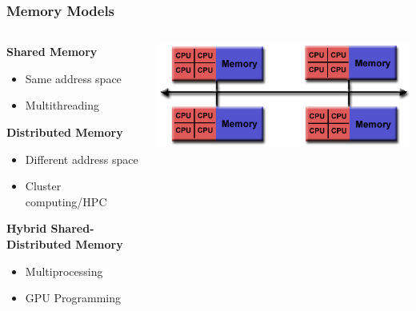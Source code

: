 \documentclass[t]{beamer}
\begin{document}
\begin{frame}
\frametitle{Memory Models}
\begin{columns}
\begin{column}{.4\textwidth}
\textbf{Shared Memory}
\begin{itemize}
  \item Same address space
  \item Multithreading
\end{itemize}

\textbf{Distributed Memory}
\begin{itemize}
  \item Different address space
  \item Cluster computing/HPC
\end{itemize}

\textbf{Hybrid Shared-Distributed Memory}
\begin{itemize}
  \item Multiprocessing
  \item GPU Programming
\end{itemize}
\end{column}

\begin{column}{.6\textwidth}
\begin{center}
\includegraphics[width=1.0\textwidth]{img/hybrid_mem.png} 
\end{center}
\end{column}
\end{columns}
\end{frame}


\end{document}
